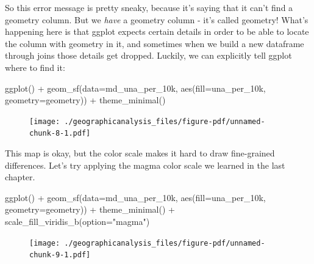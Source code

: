 \documentclass[
  letterpaper,
  DIV=11,
  numbers=noendperiod]{scrreprt}
\newenvironment{Shaded}{\begin{snugshade}}{\end{snugshade}}
\newcommand{\AttributeTok}[1]{\textcolor[rgb]{0.40,0.45,0.13}{#1}}
\newcommand{\FunctionTok}[1]{\textcolor[rgb]{0.28,0.35,0.67}{#1}}
\newcommand{\NormalTok}[1]{\textcolor[rgb]{0.00,0.23,0.31}{#1}}
\newcommand{\SpecialCharTok}[1]{\textcolor[rgb]{0.37,0.37,0.37}{#1}}
\newcommand{\StringTok}[1]{\textcolor[rgb]{0.13,0.47,0.30}{#1}}
\begin{document}
So this error message is pretty sneaky, because it's saying that it
can't find a geometry column. But we \emph{have} a geometry column -
it's called geometry! What's happening here is that ggplot expects
certain details in order to be able to locate the column with geometry
in it, and sometimes when we build a new dataframe through joins those
details get dropped. Luckily, we can explicitly tell ggplot where to
find it:

\begin{Shaded}
\begin{Highlighting}[]
\FunctionTok{ggplot}\NormalTok{() }\SpecialCharTok{+}
  \FunctionTok{geom\_sf}\NormalTok{(}\AttributeTok{data=}\NormalTok{md\_una\_per\_10k, }\FunctionTok{aes}\NormalTok{(}\AttributeTok{fill=}\NormalTok{una\_per\_10k, }\AttributeTok{geometry=}\NormalTok{geometry)) }\SpecialCharTok{+}
  \FunctionTok{theme\_minimal}\NormalTok{()}
\end{Highlighting}
\end{Shaded}

\begin{figure}[H]

{\centering \texttt{[image: ./geographicanalysis\_files/figure-pdf/unnamed-chunk-8-1.pdf]}

}

\end{figure}

This map is okay, but the color scale makes it hard to draw fine-grained
differences. Let's try applying the magma color scale we learned in the
last chapter.

\begin{Shaded}
\begin{Highlighting}[]
\FunctionTok{ggplot}\NormalTok{() }\SpecialCharTok{+}
  \FunctionTok{geom\_sf}\NormalTok{(}\AttributeTok{data=}\NormalTok{md\_una\_per\_10k, }\FunctionTok{aes}\NormalTok{(}\AttributeTok{fill=}\NormalTok{una\_per\_10k, }\AttributeTok{geometry=}\NormalTok{geometry)) }\SpecialCharTok{+}
  \FunctionTok{theme\_minimal}\NormalTok{() }\SpecialCharTok{+}
  \FunctionTok{scale\_fill\_viridis\_b}\NormalTok{(}\AttributeTok{option=}\StringTok{"magma"}\NormalTok{)}
\end{Highlighting}
\end{Shaded}

\begin{figure}[H]

{\centering \texttt{[image: ./geographicanalysis\_files/figure-pdf/unnamed-chunk-9-1.pdf]}

}

\end{figure}
\end{document}
